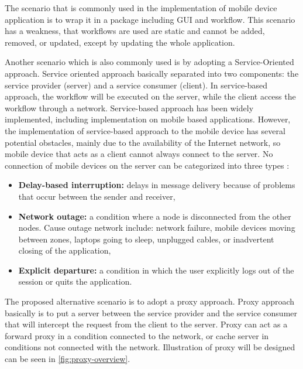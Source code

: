 \documentclass[conference]{IEEEtran}
\begin{document}
The scenario that is commonly used in the implementation of mobile device application is to wrap it in a package including GUI and workflow. This scenario has a weakness, that workflows are used are static and cannot be added, removed, or updated, except by updating the whole application.

Another scenario which is also commonly used is by adopting a Service-Oriented approach. Service oriented approach basically separated into two components: the service provider (server) and a service consumer (client). In service-based approach, the workflow will be executed on the server, while the client access the workflow through a network. Service-based approach has been widely implemented, including implementation on mobile based applications. However, the implementation of service-based approach to the mobile device has several potential obstacles, mainly due to the availability of the Internet network, so mobile device that acts as a client cannot always connect to the server. No connection of mobile devices on the server can be categorized into three types \cite{gutwin_gone_2010}:

\begin{itemize}
  \item \textbf{Delay-based interruption:} delays in message delivery because of problems that occur between the sender and receiver, 
  \item \textbf{Network outage:} a condition where a node is disconnected from the other nodes. Cause outage network include: network failure, mobile devices moving between zones, laptops going to sleep, unplugged cables, or inadvertent closing of the application,
  \item \textbf{Explicit departure:} a condition in which the user explicitly logs out of the session or quits the application.
\end{itemize}

The proposed alternative scenario is to adopt a proxy approach. Proxy approach basically is to put a server between the service provider and the service consumer that will intercept the request from the client to the server. Proxy can act as a forward proxy in a condition connected to the network, or cache server in conditions not connected with the network. Illustration of proxy will be designed can be seen in \figurename{\ref{fig:proxy-overview}}.
\end{document}

